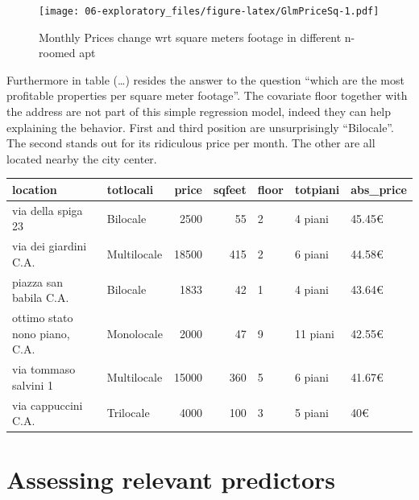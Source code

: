 \documentclass[
  12pt,
  a4paper,
  oneside]{book}
\theoremstyle{definition}
\theoremstyle{definition}
\theoremstyle{definition}
\theoremstyle{remark}
\begin{document}
\begin{figure}
\centering
\texttt{[image: 06-exploratory\_files/figure-latex/GlmPriceSq-1.pdf]}
\caption{\label{fig:GlmPriceSq}Monthly Prices change wrt square meters footage in different n-roomed apt}
\end{figure}

Furthermore in table (\ldots) resides the answer to the question ``which are the most profitable properties per square meter footage''. The covariate floor together with the address are not part of this simple regression model, indeed they can help explaining the behavior. First and third position are unsurprisingly ``Bilocale''. The second stands out for its ridiculous price per month. The other are all located nearby the city center.

\begin{tabular}{llrrlll}
\toprule
location & totlocali & price & sqfeet & floor & totpiani & abs\_price\\
\midrule
via della spiga 23 & Bilocale & 2500 & 55 & 2 & 4 piani & 45.45€\\
via dei giardini C.A. & Multilocale & 18500 & 415 & 2 & 6 piani & 44.58€\\
piazza san babila C.A. & Bilocale & 1833 & 42 & 1 & 4 piani & 43.64€\\
ottimo stato nono piano, C.A. & Monolocale & 2000 & 47 & 9 & 11 piani & 42.55€\\
via tommaso salvini 1 & Multilocale & 15000 & 360 & 5 & 6 piani & 41.67€\\
\addlinespace
via cappuccini C.A. & Trilocale & 4000 & 100 & 3 & 5 piani & 40€\\
\bottomrule
\end{tabular}

\hypertarget{assessing-relevant-predictors}{%
\section{Assessing relevant predictors}\label{assessing-relevant-predictors}}
\end{document}
